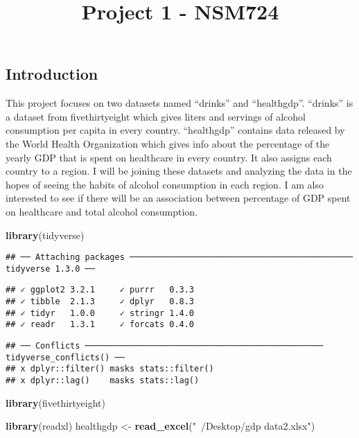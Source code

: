 \documentclass[]{article}
\title{Project 1 - NSM724}
\date{}
\newenvironment{Shaded}{\begin{snugshade}}{\end{snugshade}}
\newcommand{\KeywordTok}[1]{\textcolor[rgb]{0.13,0.29,0.53}{\textbf{#1}}}
\newcommand{\StringTok}[1]{\textcolor[rgb]{0.31,0.60,0.02}{#1}}
\newcommand{\NormalTok}[1]{#1}
\begin{document}
\maketitle

\subsection{Introduction}\label{introduction}

This project focuses on two datasets named ``drinks'' and ``healthgdp''.
``drinks'' is a dataset from fivethirtyeight which gives liters and
servings of alcohol consumption per capita in every country.
``healthgdp'' contains data released by the World Health Organization
which gives info about the percentage of the yearly GDP that is spent on
healthcare in every country. It also assigns each country to a region. I
will be joining these datasets and analyzing the data in the hopes of
seeing the habits of alcohol consumption in each region. I am also
interested to see if there will be an association between percentage of
GDP spent on healthcare and total alcohol consumption.

\begin{Shaded}
\begin{Highlighting}[]
\KeywordTok{library}\NormalTok{(tidyverse)}
\end{Highlighting}
\end{Shaded}

\begin{verbatim}
## ── Attaching packages ───────────────────────────────────────────── tidyverse 1.3.0 ──
\end{verbatim}

\begin{verbatim}
## ✓ ggplot2 3.2.1     ✓ purrr   0.3.3
## ✓ tibble  2.1.3     ✓ dplyr   0.8.3
## ✓ tidyr   1.0.0     ✓ stringr 1.4.0
## ✓ readr   1.3.1     ✓ forcats 0.4.0
\end{verbatim}

\begin{verbatim}
## ── Conflicts ──────────────────────────────────────────────── tidyverse_conflicts() ──
## x dplyr::filter() masks stats::filter()
## x dplyr::lag()    masks stats::lag()
\end{verbatim}

\begin{Shaded}
\begin{Highlighting}[]
\KeywordTok{library}\NormalTok{(fivethirtyeight)}

\KeywordTok{library}\NormalTok{(readxl)}
\NormalTok{healthgdp <-}\StringTok{ }\KeywordTok{read_excel}\NormalTok{(}\StringTok{"~/Desktop/gdp data2.xlsx"}\NormalTok{)}
\end{Highlighting}
\end{Shaded}
\end{document}
